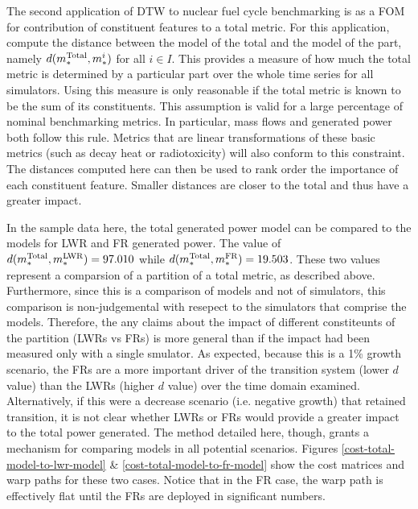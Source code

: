 The second application of DTW to nuclear fuel cycle benchmarking is as a
FOM for contribution of constituent features to a total metric. For this application, 
compute the distance between the model of the total and the model of the 
part, namely $d(m_*^{\mathrm{Total}}, m_*^i)$ for all $i \in I$. This provides a 
measure of how much the total metric is determined by a particular part
over the whole time series for all simulators.
Using this measure is only reasonable if the total metric is known 
to be the sum of its constituents.  This assumption is valid for 
a large percentage of nominal benchmarking metrics. In particular, 
mass flows and generated power both follow this rule. Metrics that are 
linear transformations of these basic metrics (such as decay heat or 
radiotoxicity) will also conform to this constraint. The distances computed here
can then be used to rank order the importance of each constituent feature. 
Smaller distances are closer to the total and thus have a greater impact.

In the sample data here, the total generated power model can be compared to 
the models for LWR and FR generated power. The value of 
$d(m_*^{\mathrm{Total}}, m_*^{\mathrm{LWR}}) = 97.010$ while $d(m_*^{\mathrm{Total}}, m_*^{\mathrm{FR}}) = 19.503$.
These two values represent a comparsion of a partition of a total metric, 
as described above.  Furthermore, since this is a comparison of models and not
of simulators, this comparison is non-judgemental with resepect to the 
simulators that comprise the models. Therefore, the any claims about the
impact of different constiteunts of the partition (LWRs vs FRs) is more general
than if the impact had been measured only with a single smulator.
As expected, because this is a 1\% growth scenario, the FRs are a more 
important driver of the transition system (lower $d$ value) than the 
LWRs (higher $d$ value) over the time domain examined. Alternatively, if this
were a decrease scenario (i.e. negative growth)
that retained transition, it is not clear whether LWRs or FRs would 
provide a greater impact to the total power generated. The method detailed
here, though, grants a mechanism for comparing models in all potential 
scenarios. Figures 
\ref{cost-total-model-to-lwr-model} \& \ref{cost-total-model-to-fr-model}
show the cost matrices and warp paths for these two cases.  Notice that in the
FR case, the warp path is effectively flat until the FRs are deployed in 
significant numbers. 
 

